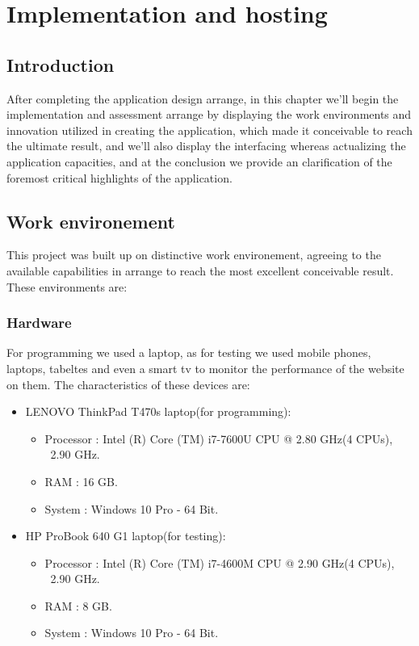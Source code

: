 \chapter{Implementation and hosting}

\section{Introduction}
After completing the application design arrange, in this chapter we'll begin the implementation and assessment arrange by displaying the work environments and innovation utilized in creating the application, which made it conceivable to reach the ultimate result, and we'll also display the interfacing whereas actualizing the application capacities, and at the conclusion we provide an clarification of the foremost critical highlights of the application. \\


\section{Work environement}
This project was built up on distinctive work environement, agreeing to the available capabilities in arrange to reach the most excellent conceivable result. These environments are:\\

\subsection{Hardware}
For programming we used a laptop, as for testing we used mobile phones, laptops, tabeltes and even a smart tv to monitor the performance of the website on them. The characteristics of
these devices are:
\begin{itemize}
	\item LENOVO ThinkPad T470s laptop(for programming):
	\begin{itemize}
		\item Processor : Intel (R) Core (TM) i7-7600U CPU @ 2.80 GHz(4 CPUs), ~2.90 GHz.
		\item RAM : 16 GB.
		\item System : Windows 10 Pro - 64 Bit.
	\end{itemize}
\end{itemize}

\begin{itemize}
	\item HP ProBook 640 G1 laptop(for testing):
	\begin{itemize}
		\item Processor : Intel (R) Core (TM) i7-4600M CPU @ 2.90 GHz(4 CPUs), ~2.90 GHz.
		\item RAM : 8 GB.
		\item System : Windows 10 Pro - 64 Bit.
	\end{itemize}
\end{itemize}

